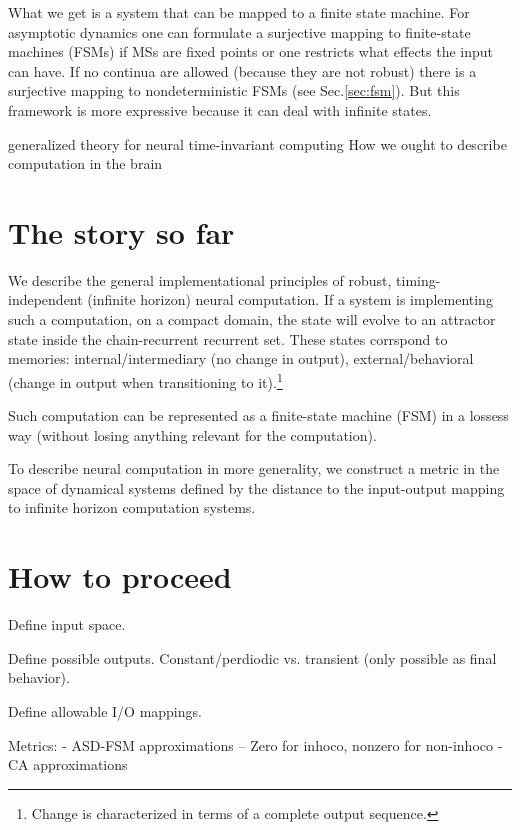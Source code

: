 \documentclass{scrartcl}
\theoremstyle{definition}
\theoremstyle{remark}
\begin{document}
What we get is a system that can be mapped to a finite state machine. %
For asymptotic dynamics one can formulate a surjective mapping to finite-state machines (FSMs) if MSs are fixed points or one restricts what effects the input can have.
If no continua are allowed (because they are not robust) there is a surjective mapping to nondeterministic FSMs (see Sec.\ref{sec:fsm}). 
But this framework is more expressive because it can deal with infinite states.



generalized theory for neural time-invariant computing \citep{jaeger2021,jaeger2023theory}
How we ought to describe computation in the brain \citep{eliasmith2010describe}



\newpage
\section*{The story so far}
We describe the general implementational principles of robust, timing-independent (infinite horizon) neural computation.
If a system is implementing such a computation, on a compact domain, the state will evolve to an attractor state inside the chain-recurrent recurrent set.
These states corrspond to memories: internal/intermediary (no change in output), external/behavioral (change in output when transitioning to it).\footnote{Change is characterized in terms of a complete output sequence.}

Such computation can be represented as a finite-state machine (FSM) in a lossess way (without losing anything relevant for the computation).

To describe neural computation in more generality, we construct a metric in the space of dynamical systems defined by the distance to the input-output mapping to infinite horizon computation systems.


\section*{How to proceed}

Define input space.

Define possible outputs. Constant/perdiodic vs. transient (only possible as final behavior).

Define allowable I/O mappings.


Metrics:
- ASD-FSM approximations	
-- Zero for inhoco, nonzero for non-inhoco
- CA approximations 
\end{document}
